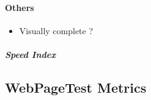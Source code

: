 




\paragraph{Others}



\begin{itemize}
\item Visually complete ?
\end{itemize}


\subparagraph{Speed Index}

















\subsection{WebPageTest Metrics}



